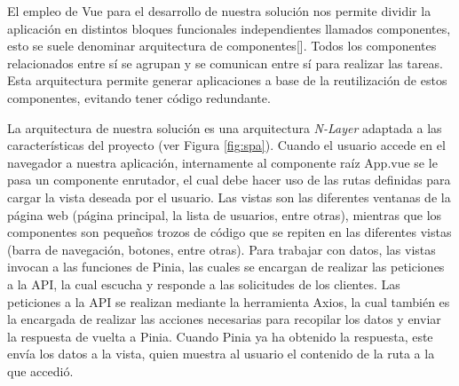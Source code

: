 %
%

El empleo de Vue para el desarrollo de nuestra solución nos permite dividir la aplicación en distintos bloques funcionales independientes llamados componentes, esto se suele denominar arquitectura de componentes[\cite{50}]. Todos los componentes relacionados entre sí se agrupan y se comunican entre sí para realizar las tareas. Esta arquitectura permite generar aplicaciones a base de la reutilización de estos componentes, evitando tener código redundante.

La arquitectura de nuestra solución es una arquitectura \textit{N-Layer} adaptada a las características del proyecto (ver Figura \ref{fig:spa}). Cuando el usuario accede en el navegador a nuestra aplicación, internamente al componente raíz App.vue se le pasa un componente enrutador, el cual debe hacer uso de las rutas definidas para cargar la vista deseada por el usuario. Las vistas son las diferentes ventanas de la página web (página principal, la lista de usuarios, entre otras), mientras que los componentes son pequeños trozos de código que se repiten en las diferentes vistas (barra de navegación, botones, entre otras). Para trabajar con datos, las vistas invocan a las funciones de Pinia, las cuales se encargan de realizar las peticiones a la API, la cual escucha y responde a las solicitudes de los clientes. Las peticiones a la API se realizan mediante la herramienta Axios, la cual también es la encargada de realizar las acciones necesarias para recopilar los datos y enviar la respuesta de vuelta a Pinia. Cuando Pinia ya ha obtenido la respuesta, este envía los datos a la vista, quien muestra al usuario el contenido de la ruta a la que accedió.




